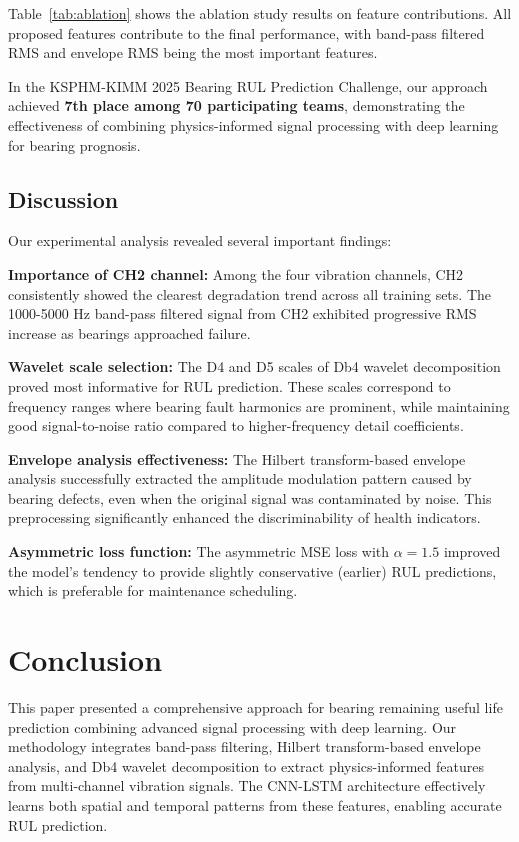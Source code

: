 \documentclass[conference,twocolumn]{IEEEtran}
\begin{document}
Table~\ref{tab:ablation} shows the ablation study results on feature contributions. All proposed features contribute to the final performance, with band-pass filtered RMS and envelope RMS being the most important features.

In the KSPHM-KIMM 2025 Bearing RUL Prediction Challenge, our approach achieved \textbf{7th place among 70 participating teams}, demonstrating the effectiveness of combining physics-informed signal processing with deep learning for bearing prognosis.

\subsection{Discussion}

Our experimental analysis revealed several important findings:

\textbf{Importance of CH2 channel:} Among the four vibration channels, CH2 consistently showed the clearest degradation trend across all training sets. The 1000-5000 Hz band-pass filtered signal from CH2 exhibited progressive RMS increase as bearings approached failure.

\textbf{Wavelet scale selection:} The D4 and D5 scales of Db4 wavelet decomposition proved most informative for RUL prediction. These scales correspond to frequency ranges where bearing fault harmonics are prominent, while maintaining good signal-to-noise ratio compared to higher-frequency detail coefficients.

\textbf{Envelope analysis effectiveness:} The Hilbert transform-based envelope analysis successfully extracted the amplitude modulation pattern caused by bearing defects, even when the original signal was contaminated by noise. This preprocessing significantly enhanced the discriminability of health indicators.

\textbf{Asymmetric loss function:} The asymmetric MSE loss with $\alpha = 1.5$ improved the model's tendency to provide slightly conservative (earlier) RUL predictions, which is preferable for maintenance scheduling.

\section{Conclusion}

This paper presented a comprehensive approach for bearing remaining useful life prediction combining advanced signal processing with deep learning. Our methodology integrates band-pass filtering, Hilbert transform-based envelope analysis, and Db4 wavelet decomposition to extract physics-informed features from multi-channel vibration signals. The CNN-LSTM architecture effectively learns both spatial and temporal patterns from these features, enabling accurate RUL prediction.
\end{document}
